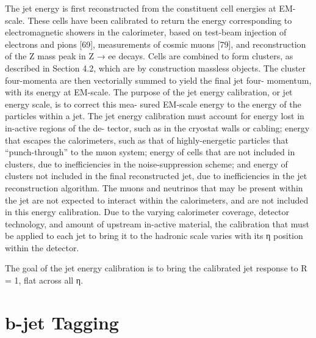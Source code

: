 The jet energy is first reconstructed from the constituent cell energies at EM-scale. These
cells have been calibrated to return the energy corresponding to electromagnetic showers
in the calorimeter, based on test-beam injection of electrons and pions [69], measurements
of cosmic muons [79], and reconstruction of the Z mass peak in Z → ee decays. Cells are
combined to form clusters, as described in Section 4.2, which are by construction massless
objects. The cluster four-momenta are then vectorially summed to yield the final jet four-
momentum, with its energy at EM-scale.
The purpose of the jet energy calibration, or jet energy scale, is to correct this mea-
sured EM-scale energy to the energy of the particles within a jet.
The jet energy calibration must account for energy lost in in-active regions of the de-
tector, such as in the cryostat walls or cabling; energy that escapes the calorimeters, such
as that of highly-energetic particles that “punch-through” to the muon system; energy of
cells that are not included in clusters, due to inefficiencies in the noise-suppression scheme;
and energy of clusters not included in the final reconstructed jet, due to inefficiencies in the
jet reconstruction algorithm. The muons and neutrinos that may be present within the jet
are not expected to interact within the calorimeters, and are not included in this energy
calibration.
Due to the varying calorimeter coverage, detector technology, and amount of upstream
in-active material, the calibration that must be applied to each jet to bring it to the hadronic
scale varies with its η position within the detector. 

The goal of the jet energy calibration is to bring the calibrated jet response to R = 1, flat
across all η.



\section{ $\bm b$-jet Tagging}\label{sec:btagging}



